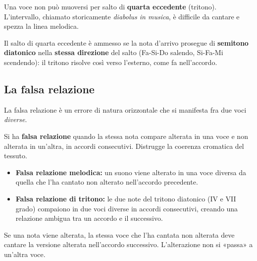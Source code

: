 \begin{errore}
	\label{err:quarta_eccedente}
	Una voce non può muoversi per salto di \textbf{quarta eccedente} (tritono). L'intervallo, chiamato storicamente \textit{diabolus in musica}, è difficile da cantare e spezza la linea melodica.
\end{errore}

\begin{regola}
	\label{reg:quarta_eccedente_eccezione}
	Il salto di quarta eccedente è ammesso se la nota d'arrivo prosegue di \textbf{semitono diatonico} nella \textbf{stessa direzione} del salto (Fa-Si-Do salendo, Si-Fa-Mi scendendo): il tritono risolve così verso l'esterno, come fa nell'accordo.
\end{regola}

\subsection{La falsa relazione}
\label{subsec:falsa_relazione}

La falsa relazione è un errore di natura orizzontale che si manifesta fra due voci \textit{diverse}.

\begin{definizione}
	\label{def:falsa_relazione}
	Si ha \textbf{falsa relazione} quando la stessa nota compare alterata in una voce e non alterata in un'altra, in accordi consecutivi. Distrugge la coerenza cromatica del tessuto.
	\begin{itemize}
		\item \textbf{Falsa relazione melodica:} un suono viene alterato in una voce diversa da quella che l'ha cantato non alterato nell'accordo precedente.
		\item \textbf{Falsa relazione di tritono:} le due note del tritono diatonico (IV e VII grado) compaiono in due voci diverse in accordi consecutivi, creando una relazione ambigua tra un accordo e il successivo.
	\end{itemize}
\end{definizione}

\begin{regola}
	\label{reg:evitare_falsa_relazione}
	Se una nota viene alterata, la stessa voce che l'ha cantata non alterata deve cantare la versione alterata nell'accordo successivo. L'alterazione non si «passa» a un'altra voce.
\end{regola}

